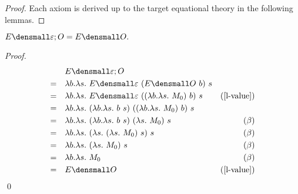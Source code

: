 \thmsoundness*
\begin{proof}
  Each axiom is derived up to the target equational theory in the following lemmas.
\end{proof}

\begin{lemma}
  \label{thm:ext-compose-id-left}
    $ E\den{\varepsilon; O} = E\den{O}.$
\end{lemma}
    \begin{proof}
        \begin{align*}
            &\quad E\den{\varepsilon; O} \\
            =& \quad \lambda b. \lambda s.~ E\den{\varepsilon} ~(E\den{O} ~b) ~s \\
            =&  \quad \lambda b. \lambda s.~ E\den{\varepsilon} ~((\lambda b. \lambda s.~ M_0) ~b) ~s & (\cref{l-value})\\
            =& \quad \lambda b. \lambda s.~ (\lambda b. \lambda s.~ b ~s) ~((\lambda b. \lambda s.~ M_0) ~b) ~s \\
            =& \quad \lambda b. \lambda s.~ (\lambda b. \lambda s.~ b ~s) ~(\lambda s.~ M_0) ~s & (\beta)\\
            =& \quad \lambda b. \lambda s.~ (\lambda s.~ (\lambda s.~ M_0) ~s) ~s & (\beta)\\
            =& \quad \lambda b. \lambda s.~ (\lambda s.~ M_0) ~s & (\beta)\\
            =& \quad \lambda b. \lambda s.~ M_0 & (\beta) \\
            =& \quad E\den{O} & (\cref{l-value})
        \end{align*}
        \qed
    \end{proof}

    
